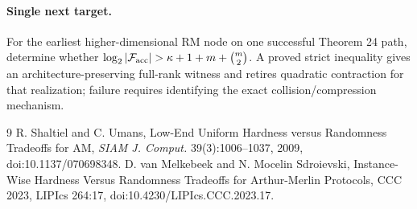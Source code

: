 \documentclass[11pt]{article}
\begin{document}
\paragraph{Single next target.} For the earliest higher-dimensional RM node on one successful Theorem 24 path, determine whether \(\log_2|\mathcal F_{\rm acc}|>\kappa+1+m+\binom m2\). A proved strict inequality gives an architecture-preserving full-rank witness and retires quadratic contraction for that realization; failure requires identifying the exact collision/compression mechanism.
\begin{thebibliography}{9}
 R. Shaltiel and C. Umans, Low-End Uniform Hardness versus Randomness Tradeoffs for AM, \emph{SIAM J. Comput.} 39(3):1006--1037, 2009, doi:10.1137/070698348.
 D. van Melkebeek and N. Mocelin Sdroievski, Instance-Wise Hardness Versus Randomness Tradeoffs for Arthur-Merlin Protocols, CCC 2023, LIPIcs 264:17, doi:10.4230/LIPIcs.CCC.2023.17.
\end{thebibliography}
\end{document}
